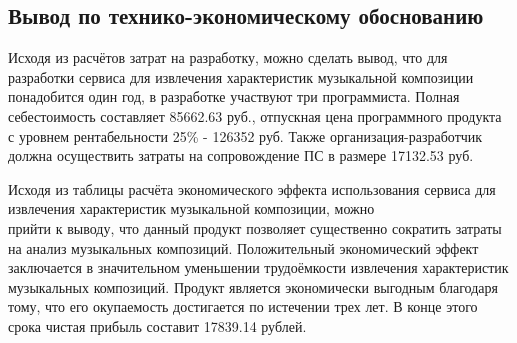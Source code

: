 \subsection{Вывод по технико-экономическому обоснованию}
\label{sec:economics:conclusion}
Исходя из расчётов затрат на разработку, можно сделать вывод, что для разработки сервиса для извлечения характеристик музыкальной композиции понадобится один год, в разработке участвуют три программиста. Полная себестоимость составляет 85662.63 руб., отпускная цена программного продукта с уровнем рентабельности 25\% - 126352 руб. Также организация-разработчик должна осуществить затраты на сопровождение ПС в размере 17132.53 руб.

Исходя из таблицы расчёта экономического эффекта использования сервиса для извлечения характеристик музыкальной композиции, можно \\прийти к выводу, что данный продукт позволяет существенно сократить затраты на анализ музыкальных композиций. Положительный экономический эффект заключается в значительном уменьшении трудоёмкости извлечения характеристик музыкальных композиций. Продукт является экономически выгодным благодаря тому, что его окупаемость достигается по истечении трех лет. В конце этого срока чистая прибыль составит 17839.14 рублей.
